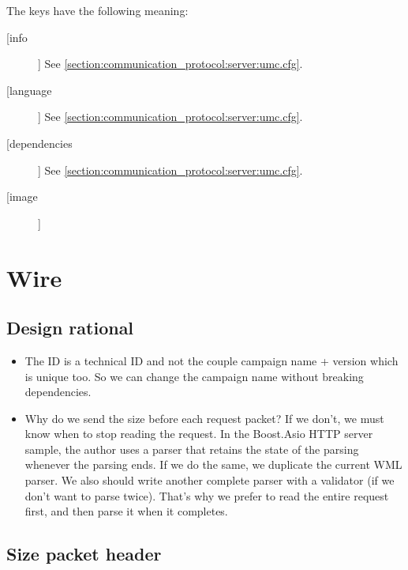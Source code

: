 The keys have the following meaning:
\begin{description}
\item[[info]]
	See \cref{section:communication_protocol:server:umc.cfg}.

\item[[language]]
  See \cref{section:communication_protocol:server:umc.cfg}.

\item[[dependencies]]
	See \cref{section:communication_protocol:server:umc.cfg}.

\item[[image]]

\end{description}

\section{Wire}
\label{section:communication_protocol:wire}

\subsection{Design rational}

\begin{itemize}
 \item The ID is a technical ID and not the couple campaign name + version which is unique too. So we can change the campaign name without breaking dependencies.
 \item Why do we send the size before each request packet? If we don't, we must know when to stop reading the request. In the Boost.Asio HTTP server sample, the author uses a parser that retains the state of the parsing whenever the parsing ends. If we do the same, we duplicate the current WML parser. We also should write another complete parser with a validator (if we don't want to parse twice). That's why we prefer to read the entire request first, and then parse it when it completes.

\end{itemize}

\subsection{Size packet header}


